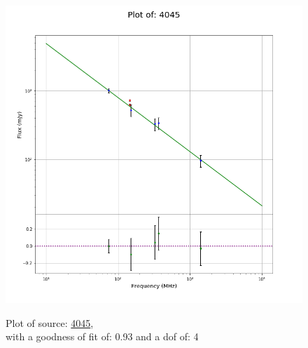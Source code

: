 \documentclass{article}
\begin{document}
\begin{figure}[H]
    \centering
    \begin{minipage}{.5\textwidth}
        \centering
        \includegraphics[scale = 0.35]{KmeulenSimSource_1hr/1hr4045.png}
        \captionsetup{labelformat=empty}
        \caption{Plot of source: \href{http://banana.transientskp.org/r4/vlo_KmeulenSimSource/runningcatalog/4045}{4045},\\with a goodness of fit of: 0.93 and a dof of: 4}
        \addtocounter{figure}{-1}
        \label{KmeulenSimSource:1hr:4045:plot}
    \end{minipage}%
    \begin{minipage}{0.5\textwidth}
        \centering


\end{minipage}
\end{figure}
\end{document}
